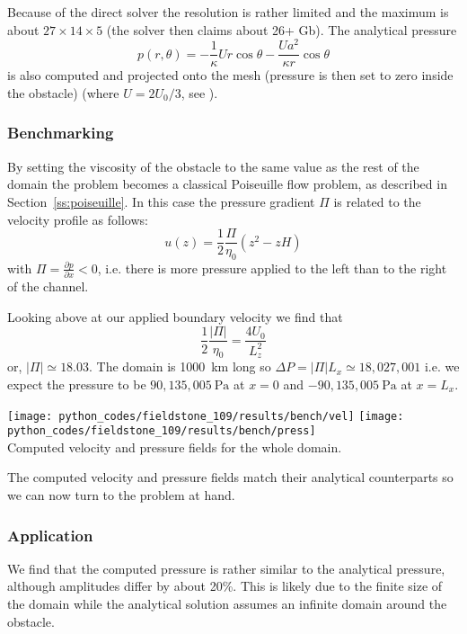 Because of the direct solver the resolution is rather limited and the maximum is 
about $27\times 14 \times 5$ (the solver then claims about 26+ Gb). The analytical pressure  
\[
p(r,\theta) = 
-\frac{1}{\kappa} U r  \cos \theta
 -\frac{U a^2 }{\kappa r}  \cos \theta
\]
is also computed and projected onto the mesh (pressure is then set to zero inside the 
obstacle) (where $U=2U_0/3$, see ). 

\subsubsection*{Benchmarking}

By setting the viscosity of the obstacle to the same value as the rest 
of the domain the problem becomes a classical Poiseuille flow problem, as 
described in Section~\ref{ss:poiseuille}.
In this case the pressure gradient $\Pi$ is related to the velocity profile 
as follows:
\[
u(z) = \frac{1}{2}\frac{\Pi}{\eta_0} (z^2 - zH)
\]
with $\Pi=\frac{\partial p}{\partial x}<0$, i.e. 
there is more pressure applied to the left than to the right of the channel.

Looking above at our applied boundary velocity we find that 
\[
\frac{1}{2}\frac{|\Pi|}{\eta_0} = \frac{4U_0}{L_z^2}
\]
or, $|\Pi|\simeq 18.03$. The domain is 1000~\si{\km} long 
so $\Delta P = |\Pi| L_x \simeq 18,027,001$ i.e. we expect the pressure to 
be $90,135,005~\si{\pascal}$ at $x=0$ and $-90,135,005~\si{\pascal}$ at $x=L_x$. 

\begin{center}
\texttt{[image: python\_codes/fieldstone\_109/results/bench/vel]}
\texttt{[image: python\_codes/fieldstone\_109/results/bench/press]}\\
{\captionfont Computed velocity and pressure fields for the whole domain.}
\end{center}

The computed velocity and pressure fields match their analytical counterparts 
so we can now turn to the problem at hand.

\subsubsection*{Application}

We find that the computed pressure is rather similar to the analytical pressure, although 
amplitudes differ by about 20\%. This is likely due to the finite size of the domain while 
the analytical solution assumes an infinite domain around the obstacle.

